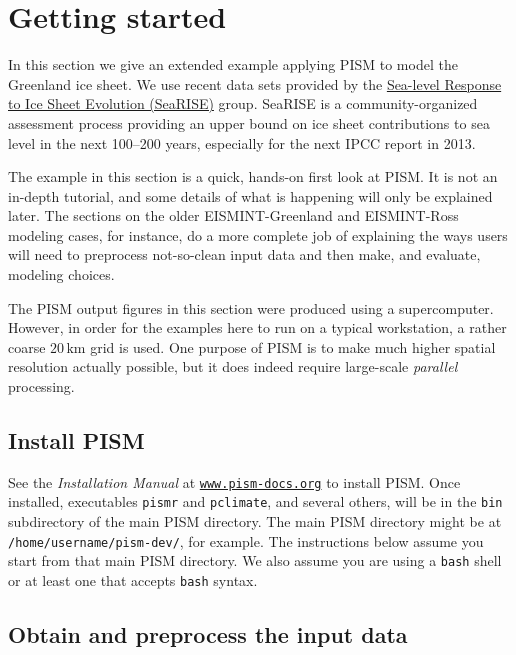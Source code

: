 
\section{Getting started}\label{sect:start}

In this section we give an extended example applying PISM to model the Greenland ice sheet.  We use recent data sets provided by the \href{http://websrv.cs.umt.edu/isis/index.php/SeaRISE_Assessment}{Sea-level Response to Ice Sheet Evolution (SeaRISE)} group.  SeaRISE is a community-organized assessment process providing an upper bound on ice sheet contributions to sea level in the next 100--200 years, especially for the next IPCC report in 2013.

The example in this section is a quick, hands-on first look at PISM.  It is not an in-depth tutorial, and some details of what is happening will only be explained later.  The sections on the older \mbox{EISMINT-Greenland} and \mbox{EISMINT-Ross} modeling cases, for instance, do a more complete job of explaining the ways users will need to preprocess not-so-clean input data and then make, and evaluate, modeling choices.

The PISM output figures in this section were produced using a supercomputer.  However, in order for the examples here to run on a typical workstation, a rather coarse $20\,\textrm{km}$ grid is used.  One purpose of PISM is to make much higher spatial resolution actually possible, but it does indeed require large-scale \emph{parallel} processing.


\subsection{Install PISM}

See the \emph{Installation Manual} at \href{http://www.pism-docs.org}{\texttt{www.pism-docs.org}}
to install PISM.  Once installed, executables \texttt{pismr} and \texttt{pclimate}, and several others, will be in the \texttt{bin} subdirectory of the main PISM directory.  The main PISM directory might be at \texttt{/home/username/pism-dev/}, for example.  The instructions below assume you start from that main PISM directory.  We also assume you are using a \texttt{bash} shell or at least one that accepts \texttt{bash} syntax.


\subsection{Obtain and preprocess the input data}

